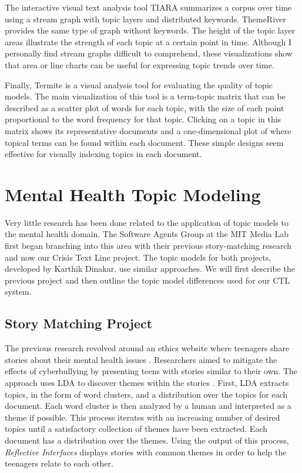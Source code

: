The interactive visual text analysis tool TIARA \cite{tiara} summarizes a corpus over
time using a stream graph with topic layers and distributed keywords. ThemeRiver
\cite{theme-river} provides the same type of graph without keywords. The height of the topic layer
areas illustrate the strength of each topic at a certain point in time. Although I
personally find stream graphs difficult to comprehend, these visualizations show that
area or line charts can be useful for expressing topic trends over time.

Finally, Termite \cite{termite} is a visual analysis tool for evaluating the quality of topic
models. The main visualization of this tool is a term-topic matrix that can be described
as a scatter plot of words for each topic, with the size of each point proportional
to the word frequency for that topic. Clicking on a topic in this matrix shows its
representative documents and a one-dimensional plot of where topical terms can be
found within each document. These simple designs seem effective for visually indexing
topics in each document.

\section{Mental Health Topic Modeling}

Very little research has been done related to the application of topic models to the
mental health domain. The Software Agents Group at the MIT Media Lab first began
branching into this area with their previous story-matching research and now our
Crisis Text Line project. The topic models for both projects, developed by Karthik
Dinakar, use similar approaches. We will first describe the previous project and then
outline the topic model differences used for our CTL system.

\subsection{Story Matching Project}

The previous research revolved around an ethics website where teenagers share stories
about their mental health issues \cite{mtv-atl}. Researchers aimed to mitigate the effects of
cyberbullying by presenting teens with stories similar to their own. The approach
uses LDA to discover themes within the stories \cite{dinakar-mtv}. First, LDA extracts topics, in the
form of word clusters, and a distribution over the topics for each document. Each
word cluster is then analyzed by a human and interpreted as a theme if possible.
This process iterates with an increasing number of desired topics until a satisfactory
collection of themes have been extracted. Each document has a distribution over the
themes. Using the output of this process, \textit{Reflective Interfaces} \cite{reflective-interfaces} displays stories
with common themes in order to help the teenagers relate to each other.

